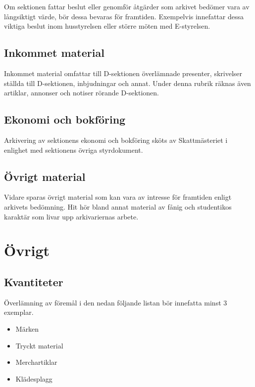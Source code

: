 \documentclass{dsekprotokoll}
\begin{document}
Om sektionen fattar beslut eller genomför åtgärder som arkivet
bedömer vara av långsiktigt värde, bör dessa bevaras för framtiden.
Exempelvis innefattar dessa viktiga beslut inom husstyrelsen eller
större möten med E-styrelsen.

\subsection{Inkommet material}
Inkommet material omfattar till D-sektionen överlämnade presenter,
skrivelser ställda till D-sektionen, inbjudningar och annat. Under
denna rubrik räknas även artiklar, annonser och notiser rörande D-sektionen.

\subsection{Ekonomi och bokföring}
Arkivering av sektionens ekonomi och bokföring sköts av
Skattmästeriet i enlighet med sektionens övriga styrdokument.

\subsection{Övrigt material}
Vidare sparas övrigt material som kan vara av intresse för framtiden
enligt arkivets bedömning. Hit hör bland annat material av fånig och
studentikos karaktär som livar upp arkivariernas arbete.

\section{Övrigt}

\subsection*{Kvantiteter}

Överlämning av föremål i den nedan följande listan bör innefatta
minst 3 exemplar.

\begin{itemize}
  \item Märken
  \item Tryckt material
  \item Merchartiklar
  \item Klädesplagg
\end{itemize}
\end{document}
